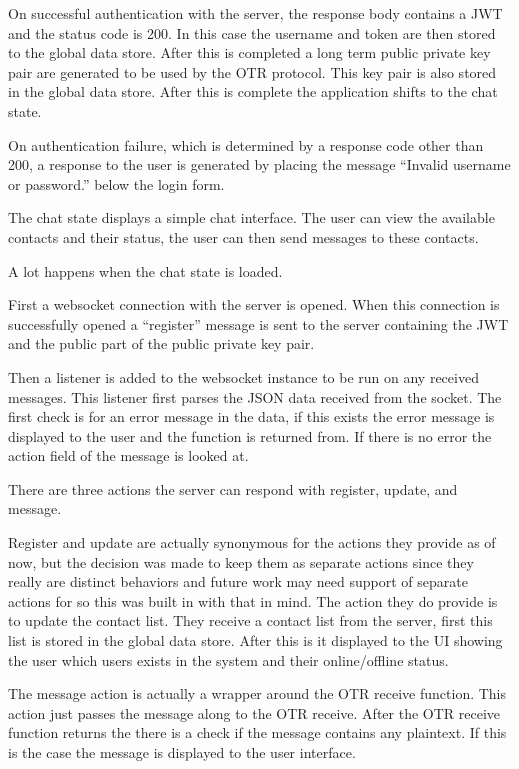 On successful authentication with the server, the response body contains a JWT and the status code is 200. In this case the username and token are then stored to the global data store. After this is completed a long term public private key pair are generated to be used by the OTR protocol. This key pair is also stored in the global data store. After this is complete the application shifts to the chat state.


On authentication failure, which is determined by a response code other than 200, a response to the user is generated by placing the message “Invalid username or password.” below the login form. 


The chat state displays a simple chat interface. The user can view the available contacts and their status, the user can then send messages to these contacts. 


A lot happens when the chat state is loaded. 


First a websocket connection with the server is opened. When this connection is successfully opened a “register” message is sent to the server containing the JWT and the public part of the public private key pair. 


Then a listener is added to the websocket instance to be run on any received messages. This listener first parses the JSON data received from the socket. The first check is for an error message in the data, if this exists the error message is displayed to the user and the function is returned from. If there is no error the action field of the message is looked at. 


There are three actions the server can respond with register, update, and message.


Register and update are actually synonymous for the actions they provide as of now, but the decision was made to keep them as separate actions since they really are distinct behaviors and future work may need support of separate actions for so this was built in with that in mind. The action they do provide is to update the contact list. They receive a contact list from the server, first this list is stored in the global data store. After this is it displayed to the UI showing the user which users exists in the system and their online/offline status.


The message action is actually a wrapper around the OTR receive function. This action just passes the message along to the OTR receive. After the OTR receive function returns the there is a check if the message contains any plaintext. If this is the case the message is displayed to the user interface.


